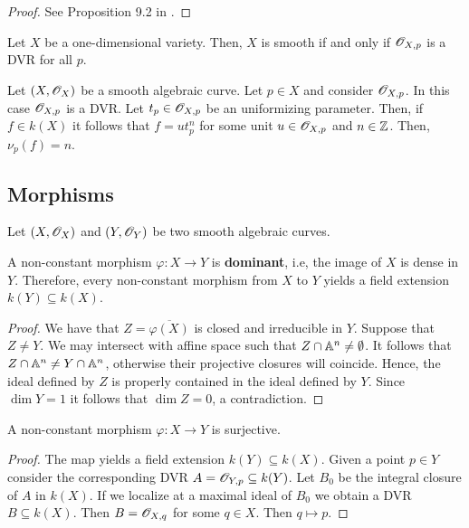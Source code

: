 \begin{proof}
	See Proposition 9.2 in \cite{atiyah}.
\end{proof}
\begin{corollary}\label{cor:smoothness-DVR-curves}
	Let $X$ be a one-dimensional variety. Then, $X$ is smooth if and only if ${\mathscr O}_{X,p}$ is a DVR for all $p$.
\end{corollary}
\begin{example}\label{ex:stalk-of-regular-functions-as-a-DVR}
	Let $(X,{\mathscr O}_{X})$ be a smooth algebraic curve. Let $p \in X$ and consider ${\mathscr O}_{X,p}$. In this case ${\mathscr O}_{X,p}$ is a DVR. Let $t_{p}\in {\mathscr O}_{X,p}$ be an uniformizing parameter. Then, if $f \in k(X)$ it follows that $f = ut_{p}^{n}$ for some  unit $u\in {\mathscr O}_{X,p}$ and $n \in {\mathbb Z}$. Then, $\nu_{p}(f) = n$.
\end{example}
\subsection{Morphisms}
Let $(X,{\mathscr O}_{X})$ and $(Y,{\mathscr O}_{Y})$ be two smooth algebraic curves. 
\begin{proposition}\label{prop:non-constant-morphism-is-dominant}
	A non-constant morphism $\varphi\colon X\to Y$ is \textbf{dominant}, i.e, the image of $X$ is dense in $Y$. Therefore, every non-constant morphism from $X$ to $Y$ yields a field extension $k(Y)\subseteq k(X)$.
\end{proposition}
\begin{proof}
	We have that $Z = \overline{\varphi(X)}$ is closed and irreducible in $Y$. Suppose that $Z \neq Y$. We may intersect with affine space such that $Z \cap {\mathbb A}^{n}\neq \emptyset$. It follows that $Z\cap {\mathbb A}^{n}\neq Y\cap {\mathbb A}^{n}$, otherwise their projective closures will coincide. Hence, the ideal defined by $Z$ is properly contained in the ideal defined by $Y$. Since $\dim Y = 1$ it follows that $\dim Z = 0$, a contradiction.
\end{proof}

\begin{proposition}\label{prop:non-constant-morphism-is-surjective}
	A non-constant morphism $\varphi\colon X\to Y$ is surjective. 
\end{proposition}

\begin{proof}
	The map yields a field extension $k(Y) \subseteq k(X)$. Given a point $p\in Y$ consider the corresponding DVR $A = {\mathscr O}_{Y,p}\subseteq k(Y)$. Let $B_{0}$ be the integral closure of $A$ in $k(X)$. If we localize at a maximal ideal of $B_{0}$ we obtain a DVR $B \subseteq k(X)$. Then $B = {\mathscr O}_{X,q}$ for some $q \in X$. Then $q \mapsto p$. 
\end{proof}


